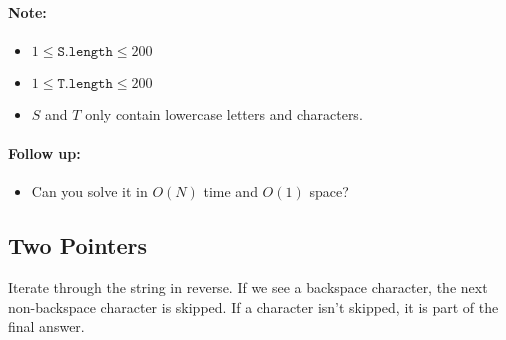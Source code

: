 \paragraph{Note:}

\begin{itemize}
\item $1 \leq \texttt{S.length} \leq 200$
\item $1 \leq \texttt{T.length} \leq 200$
\item $S$ and $T$ only contain lowercase letters and  characters.
\end{itemize}

\paragraph{Follow up:}

\begin{itemize}
\item Can you solve it in $ O(N) $ time and $ O(1) $ space?
\end{itemize}

\subsection{Two Pointers}

Iterate through the string in reverse. If we see a backspace character, the next non-backspace character is skipped. If a character isn't skipped, it is part of the final answer.

